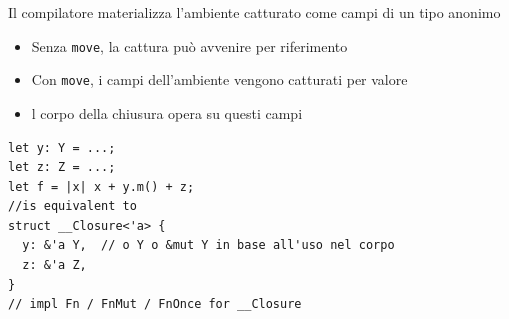 \begin{flushleft}
  \begin{minipage}{0.5\linewidth}
    \raggedright
    Il compilatore materializza l'ambiente catturato come campi di un tipo
    anonimo

    \begin{itemize}
      \item Senza \verb|move|, la cattura può avvenire per riferimento
      \item Con \verb|move|, i campi dell'ambiente vengono catturati per
            valore
      \item l corpo della chiusura opera su questi campi
    \end{itemize}
  \end{minipage}%
  \hfill
  \begin{minipage}{0.45\linewidth}
    \begin{verbatim}
let y: Y = ...;
let z: Z = ...;
let f = |x| x + y.m() + z;  
//is equivalent to
struct __Closure<'a> {
  y: &'a Y,  // o Y o &mut Y in base all'uso nel corpo
  z: &'a Z, 
}
// impl Fn / FnMut / FnOnce for __Closure
   \end{verbatim}
  \end{minipage}
\end{flushleft}






